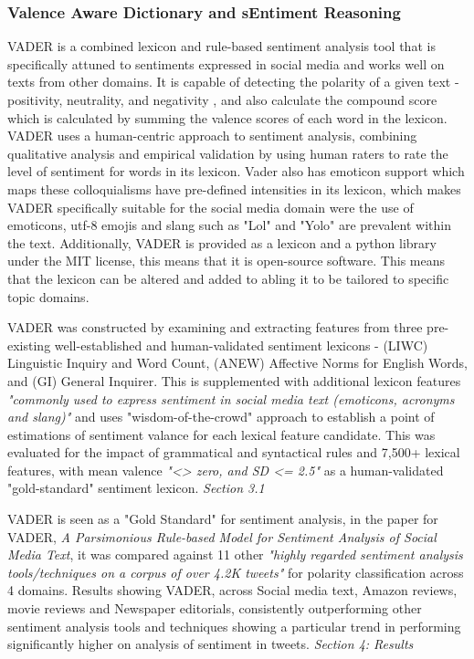 \documentclass[oneside, 12pt]{article}
\begin{document}
			\subsubsection{Valence Aware Dictionary and sEntiment Reasoning}\label{Vader}
				VADER is a combined lexicon and rule-based sentiment analysis tool that is specifically attuned to sentiments expressed in social media and works well on texts from other domains. It is capable of detecting the polarity of a given text - positivity, neutrality, and negativity \cite{12}, and also calculate the compound score which is calculated by summing the valence scores of each word in the lexicon. VADER uses a human-centric approach to sentiment analysis, combining qualitative analysis and empirical validation by using human raters to rate the level of sentiment for words in its lexicon. Vader also has emoticon support which maps these colloquialisms have pre-defined intensities in its lexicon, which makes VADER specifically suitable for the social media domain were the use of emoticons, utf-8 emojis and slang such as "Lol" and "Yolo" are prevalent within the text. Additionally, VADER is provided as a lexicon and a python library under the MIT license, this means that it is open-source software. This means that the lexicon can be altered and added to abling it to be tailored to specific topic domains. 
				
				VADER was constructed by examining and extracting features from three pre-existing well-established and human-validated sentiment lexicons \cite{12} - (LIWC) Linguistic Inquiry and Word Count, (ANEW) Affective Norms for English Words, and (GI) General Inquirer. This is supplemented with additional lexicon features \textit{"commonly used to express sentiment in social media text (emoticons, acronyms and slang)"} \cite{12} and uses "wisdom-of-the-crowd" approach \cite{13} to establish a point of estimations of sentiment valance for each lexical feature candidate. This was evaluated for the impact of grammatical and syntactical rules and 7,500+ lexical features, with mean valence \textit{"<> zero, and SD <= 2.5"} as a human-validated "gold-standard" sentiment lexicon. \cite{12}\textit{Section 3.1}
				
				VADER is seen as a "Gold Standard" for sentiment analysis, in the paper for VADER, \cite{12} \textit{A Parsimonious Rule-based Model for Sentiment Analysis of Social Media Text}, it was compared against 11 other \textit{"highly regarded sentiment analysis tools/techniques on a corpus of over 4.2K tweets"} for polarity classification across 4 domains. Results showing VADER, across Social media text, Amazon reviews, movie reviews and Newspaper editorials, consistently outperforming other sentiment analysis tools and techniques showing a particular trend in performing significantly higher on analysis of sentiment in tweets. \cite{12} \textit{Section 4: Results}
			
\end{document}
